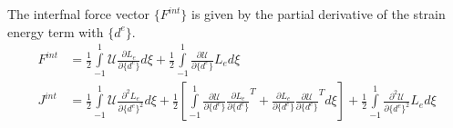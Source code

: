 \documentclass[10pt]{article}
\begin{document}
The interfnal force vector $\{F^{int}\}$ is given by the partial
derivative of the strain energy term with $\{ d^e \}$.
\begin{align}
  F^{int} &= \frac{1}{2}\int\limits_{-1}^1 \mathcal{U}\frac{\partial
            L_e}{\partial \{d^e\}}d\xi +
            \frac{1}{2}\int\limits_{-1}^1
            \frac{\partial\mathcal{U}}{\partial \{d^e\}}
            L_ed\xi\nonumber\\
  J^{int} &= \frac{1}{2}\int\limits_{-1}^1 \mathcal{U}\frac{\partial^2
            L_e}{\partial \{d^e\}^2}d\xi +
            \frac{1}{2}\left[\int\limits_{-1}^1
            \frac{\partial\mathcal{U}}{\partial \{d^e\}}
            {\frac{\partial L_e}{\partial \{d^e\}}}^T +
            \frac{\partial L_e}{\partial \{d^e\}}
            {\frac{\partial\mathcal{U}}{\partial \{d^e\}}}^T d\xi
            \right] + \frac{1}{2}\int\limits_{-1}^1 \frac{\partial^2
            \mathcal{U}}{\partial \{d^e\}^2}L_ed\xi
  \label{eq:fint}
\end{align}
\end{document}
